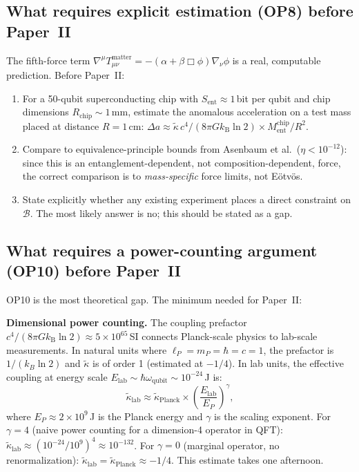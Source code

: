 \documentclass[12pt,letterpaper]{article}
\theoremstyle{plain}
\theoremstyle{definition}
\newcommand{\kB}{k_{\mathrm{B}}}
\newcommand{\lP}{\ell_{P}}
\newcommand{\kt}{\tilde{\kappa}}
\newcommand{\Sent}{S_{\mathrm{ent}}}
\newcommand{\Ment}{M_{\mathrm{ent}}}
\newcommand{\Bobs}{\mathcal{B}}
\begin{document}
\subsection{What requires explicit estimation (OP8) before Paper~II}

The fifth-force term $\nabla^\mu T^{\mathrm{matter}}_{\mu\nu} = -(\alpha+\beta\Box\phi)\nabla_\nu\phi$ is a real, computable prediction.  Before Paper~II:

\begin{enumerate}[noitemsep]
  \item For a 50-qubit superconducting chip with $\Sent \approx 1$\,bit per qubit and chip dimensions $R_{\mathrm{chip}} \sim 1$\,mm, estimate the anomalous acceleration on a test mass placed at distance $R = 1$\,cm: $\Delta a \approx \kt\,c^4/(8\pi G\kB\ln 2)\times\Ment^{\mathrm{chip}}/R^2$.
  \item Compare to equivalence-principle bounds from Asenbaum et al.\ ($\eta < 10^{-12}$): since this is an entanglement-dependent, not composition-dependent, force, the correct comparison is to \emph{mass-specific} force limits, not Eötvös.
  \item State explicitly whether any existing experiment places a direct constraint on $\Bobs$.  The most likely answer is no; this should be stated as a gap.
\end{enumerate}

\subsection{What requires a power-counting argument (OP10) before Paper~II}

OP10 is the most theoretical gap.  The minimum needed for Paper~II:

\textbf{Dimensional power counting.}  The coupling prefactor $c^4/(8\pi G\kB\ln 2) \approx 5\times10^{65}$\,SI connects Planck-scale physics to lab-scale measurements.  In natural units where $\lP = m_P = \hbar = c = 1$, the prefactor is $1/(k_B\ln 2)$ and $\kt$ is of order 1 (estimated at $-1/4$).  In lab units, the effective coupling at energy scale $E_{\mathrm{lab}} \sim \hbar\omega_{\mathrm{qubit}} \sim 10^{-24}$\,J is:
\begin{equation}
  \kt_{\mathrm{lab}} \approx \kt_{\mathrm{Planck}} \times
  \left(\frac{E_{\mathrm{lab}}}{E_P}\right)^\gamma,
  \label{eq:renorm}
\end{equation}
where $E_P \approx 2\times10^9$\,J is the Planck energy and $\gamma$ is the scaling exponent.  For $\gamma = 4$ (naive power counting for a dimension-4 operator in QFT): $\kt_{\mathrm{lab}} \approx (10^{-24}/10^9)^4 \approx 10^{-132}$.  For $\gamma = 0$ (marginal operator, no renormalization): $\kt_{\mathrm{lab}} = \kt_{\mathrm{Planck}} \approx -1/4$.  This estimate takes one afternoon.
\end{document}

